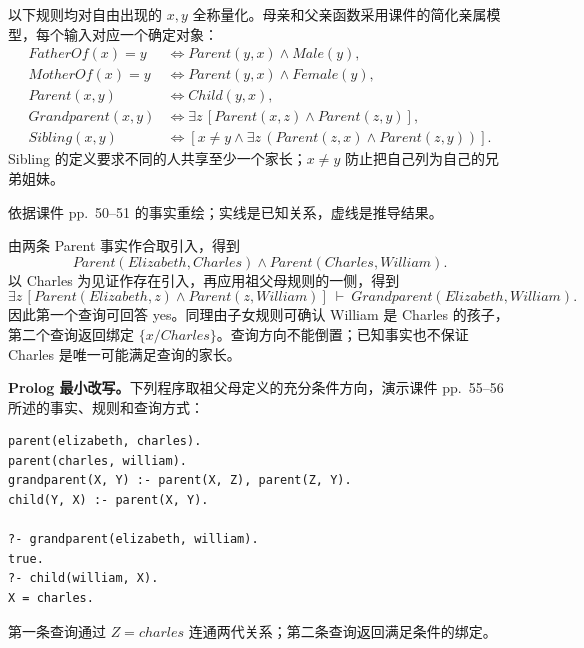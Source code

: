 \begin{workedsolution}
以下规则均对自由出现的 $x,y$ 全称量化。母亲和父亲函数采用课件的简化亲属模型，每个输入对应一个确定对象：
\begin{align*}
 FatherOf(x)=y&\Leftrightarrow Parent(y,x)\land Male(y),\\
 MotherOf(x)=y&\Leftrightarrow Parent(y,x)\land Female(y),\\
 Parent(x,y)&\Leftrightarrow Child(y,x),\\
 Grandparent(x,y)&\Leftrightarrow
   \exists z\,[Parent(x,z)\land Parent(z,y)],\\
 Sibling(x,y)&\Leftrightarrow
   [x\ne y\land\exists z\,(Parent(z,x)\land Parent(z,y))].
\end{align*}
Sibling 的定义要求不同的人共享至少一个家长；$x\ne y$ 防止把自己列为自己的兄弟姐妹。

\begin{center}


\small 依据课件 pp.~50--51 的事实重绘；实线是已知关系，虚线是推导结果。
\end{center}

由两条 Parent 事实作合取引入，得到
\[
 Parent(Elizabeth,Charles)\land Parent(Charles,William).
\]
以 Charles 为见证作存在引入，再应用祖父母规则的一侧，得到
\[
 \exists z\,[Parent(Elizabeth,z)\land Parent(z,William)]
 \ \vdash\ \boxed{Grandparent(Elizabeth,William)}.
\]
因此第一个查询可回答 yes。同理由子女规则可确认 William 是 Charles 的孩子，第二个查询返回绑定 $\{x/Charles\}$。查询方向不能倒置；已知事实也不保证 Charles 是唯一可能满足查询的家长。

\textbf{Prolog 最小改写。}下列程序取祖父母定义的充分条件方向，演示课件 pp.~55--56 所述的事实、规则和查询方式：
\begin{verbatim}
parent(elizabeth, charles).
parent(charles, william).
grandparent(X, Y) :- parent(X, Z), parent(Z, Y).
child(Y, X) :- parent(X, Y).

?- grandparent(elizabeth, william).
true.
?- child(william, X).
X = charles.
\end{verbatim}
第一条查询通过 $Z=charles$ 连通两代关系；第二条查询返回满足条件的绑定。
\end{workedsolution}
\endgroup
